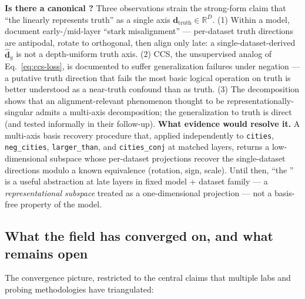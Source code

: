 \begin{contradiction}
\textbf{Is there a canonical ?} Three observations
strain the strong-form claim that ``the  linearly represents
truth'' as a single axis $\mathbf{d}_\mathrm{truth} \in \mathbb{R}^D$.
\textsf{(1)} Within a model,
\citet[\S 4]{marks-tegmark-2023-truth} document early-/mid-layer
``stark misalignment'' --- per-dataset truth directions are
antipodal, rotate to orthogonal, then align only late: a
single-dataset-derived $\hat{\mathbf{d}}_y$ is not a depth-uniform
truth axis. \textsf{(2)} CCS, the unsupervised analog of
Eq.~\eqref{eq:ccs-loss}, is documented to suffer generalization
failures under negation \citep[\S 1.1]{marks-tegmark-2023-truth}
 --- a putative truth
direction that fails the most basic logical operation on truth is
better understood as a near-truth confound than as truth.
\textsf{(3)} The
\citet{vennemeyer2025-sycophancy-not-one-thing} 
decomposition shows that an alignment-relevant phenomenon thought to
be representationally-singular admits a multi-axis decomposition; the
generalization to truth is direct (and tested informally in their
follow-up). \textbf{What evidence would resolve it.} A multi-axis
basis recovery procedure that, applied independently to
\texttt{cities}, \texttt{neg\_cities}, \texttt{larger\_than}, and
\texttt{cities\_conj} at matched layers, returns a low-dimensional
subspace whose per-dataset projections recover the
single-dataset directions modulo a known equivalence (rotation,
sign, scale). Until then, ``the '' is a useful
abstraction at late layers in fixed model + dataset family --- a
\emph{representational subspace} treated as a one-dimensional
projection --- not a basis-free property of the model.
\end{contradiction}

\subsection{What the field has converged on, and what remains open}
\label{sec:truth-frontier}

The convergence picture, restricted to the central claims that
multiple labs and probing methodologies have triangulated:

